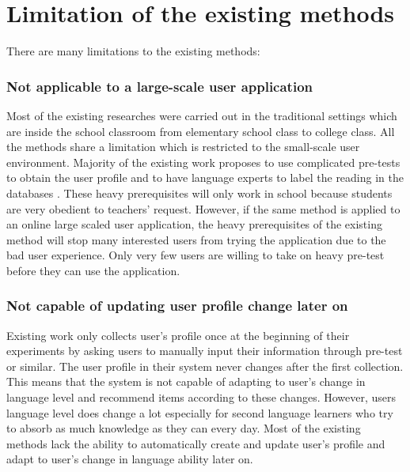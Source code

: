 \section{Limitation of the existing methods}
There are many limitations to the existing methods:

\subsubsection{Not applicable to a large-scale user application}
\vspace{10pt}
Most of the existing researches were carried out in the traditional settings which are inside the school classroom from elementary school class to college class. All the methods share a limitation which is restricted to the small-scale user environment. Majority of the existing work proposes to use complicated pre-tests to obtain the user profile and to have language experts to label the reading in the databases \cite{Kuo2014, Hwang2010}. These heavy prerequisites will only work in school because students are very obedient to teachers' request. However, if the same method is applied to an online large scaled user application, the heavy prerequisites of the existing method will stop many interested users from trying the application due to the bad user experience. Only very few users are willing to take on heavy pre-test before they can use the application. 

\subsubsection{Not capable of updating user profile change later on}
\vspace{10pt}
Existing work only collects user's profile once at the beginning of their experiments by asking users to manually input their information through pre-test or similar. The user profile in their system never changes after the first collection. This means that the system is not capable of adapting to user's change in language level and recommend items according to these changes. However, users language level does change a lot especially for second language learners who try to absorb as much knowledge as they can every day. Most of the existing methods lack the ability to automatically create and update user's profile and adapt to user's change in language ability later on.


